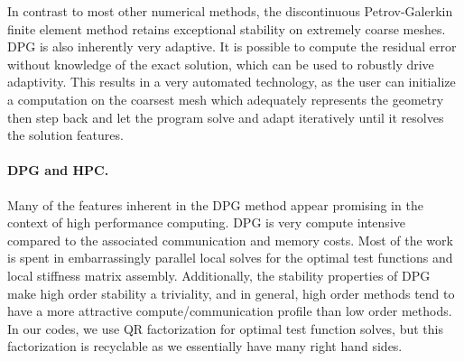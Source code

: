 \documentclass[letterpaper,12pt]{article}
\begin{document}
In contrast to most other numerical methods, the discontinuous Petrov-Galerkin finite element method retains exceptional stability on extremely coarse meshes.
DPG is also inherently very adaptive.
It is possible to compute the residual error without knowledge of the exact solution, which can be used to robustly drive adaptivity.
This results in a very automated technology, as the user can initialize a computation on the coarsest mesh which adequately represents the geometry 
then step back and let the program solve and adapt iteratively until it resolves the solution features.

\paragraph{DPG and HPC.}
Many of the features inherent in the DPG method appear promising in the context of high performance computing.
DPG is very compute intensive compared to the associated communication and memory costs.
Most of the work is spent in embarrassingly parallel local solves for the optimal test functions and local stiffness matrix assembly.
Additionally, the stability properties of DPG make high order stability a triviality, and in general, 
high order methods tend to have a more attractive compute/communication profile than low order methods.
In our codes, we use QR factorization for optimal test function solves, but this factorization is recyclable as we essentially have many right hand sides.
\end{document}
